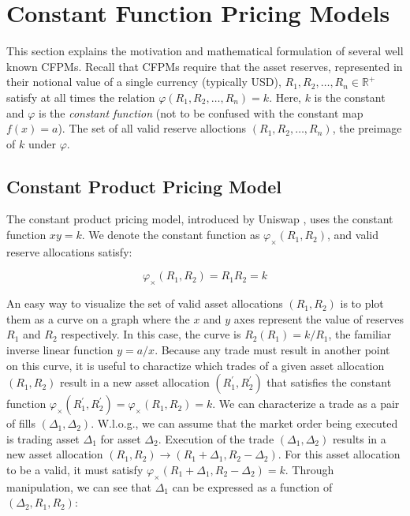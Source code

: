\documentclass{article}
\begin{document}
\section{Constant Function Pricing Models}
\label{sec:cfpm}

This section explains the motivation and mathematical formulation of several well known CFPMs. Recall that CFPMs require that the asset reserves, represented in their notional value of a single currency (typically USD), $R_{1}, R_{2}, \dots, R_{n} \in \mathbb{R}^{+}$ satisfy at all times the relation $\varphi(R_{1}, R_{2}, \dots, R_{n}) = k$. Here, $k$ is the constant and $\varphi$ is the \emph{constant function} (not to be confused with the constant map $f(x) = a$). The set of all valid reserve alloctions $(R_{1}, R_{2}, \dots, R_{n})$, the preimage of $k$ under $\varphi$.

\subsection{Constant Product Pricing Model}
\label{sec:cppm}
The constant product pricing model, introduced by Uniswap \cite{uniswapv2}, uses the constant function $xy = k$. We denote the constant function as $\varphi_{\times}(R_{1}, R_{2})$, and valid reserve allocations satisfy:

\begin{equation}
\varphi_{\times}(R_1, R_2) = R_1R_2 = k
\end{equation}

An easy way to visualize the set of valid asset allocations $(R_{1}, R_{2})$ is to plot them as a curve on a graph where the $x$ and $y$ axes represent the value of reserves $R_1$ and $R_2$ respectively. In this case, the curve is $R_2(R_1) = k / R_1$, the familiar inverse linear function $y = a / x$. Because any trade must result in another point on this curve, it is useful to charactize which trades of a given asset allocation $(R_{1}, R_{2})$ result in a new asset allocation $(R_{1}^{\prime}, R_{2}^{\prime})$ that satisfies the constant function $\varphi_{\times}(R_{1}^{\prime}, R_{2}^{\prime}) = \varphi_{\times}(R_{1}, R_{2}) = k$. We can characterize a trade as a pair of fills $(\Delta_1, \Delta_2)$. W.l.o.g., we can assume that the market order being executed is trading asset $\Delta_1$ for asset $\Delta_2$. Execution of the trade $(\Delta_1, \Delta_2)$ results in a new asset allocation $(R_1, R_2) \rightarrow (R_1 + \Delta_1, R_2 - \Delta_2)$. For this asset allocation to be a valid, it must satisfy $\varphi_{\times}(R_1 + \Delta_1, R_2 - \Delta_2) = k$. Through manipulation, we can see that $\Delta_1$ can be expressed as a function of $(\Delta_2, R_1, R_2)$:
\end{document}
